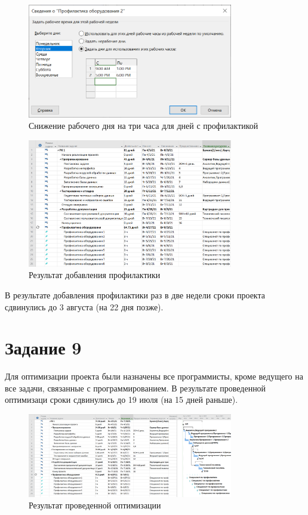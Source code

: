 \begin{figure}[H]
    \centering
    \includegraphics[width=0.8\textwidth]{img/content/task_08_3_2.png}
    \caption{Снижение рабочего дня на три часа для дней с профилактикой}
    \label{fig:task_08_3_2}
\end{figure}

\begin{figure}[H]
    \centering
    \includegraphics[width=0.8\textwidth]{img/content/task_08_finish.png}
    \caption{Результат добавления профилактики}
    \label{fig:task_08_finish}
\end{figure}

В результате добавления профилактики раз в две недели сроки проекта сдвинулись до 3 августа (на 22 дня позже).

\section{Задание 9}

Для оптимизации проекта были назначены все программисты, кроме ведущего на все задачи, связанные с программированием. В результате проведенной оптимизаци сроки сдвинулись до 19 июля (на 15 дней раньше).

\begin{figure}[H]
    \centering
    \includegraphics[width=0.8\textwidth]{img/content/task_09_1.png}
    \caption{Результат проведенной оптимизации}
    \label{fig:task_09_1}
\end{figure}

